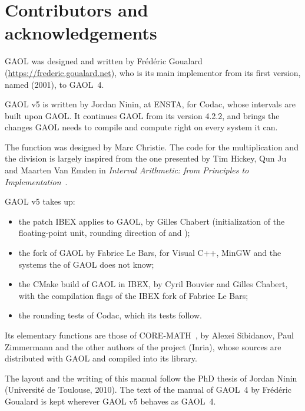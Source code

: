 \documentclass[12pt,a4paper,twoside,openright]{book}
\begin{document}
\chapter*{Contributors and acknowledgements}
\thispagestyle{plain}

GAOL was designed and written by Fr\'ed\'eric Goualard
(\url{https://frederic.goualard.net}), who is its main implementor from its
first version, named  (2001), to GAOL~4.

GAOL v5 is written by Jordan Ninin, at ENSTA, for Codac, whose intervals are
built upon GAOL. It continues GAOL from its version 4.2.2, and brings the
changes GAOL needs to compile and compute right on every system it can.

\medskip
The function  was
designed by Marc Christie. The code for the multiplication and the division
is largely inspired from the one presented by Tim Hickey, Qun Ju and Maarten
Van Emden in \emph{Interval Arithmetic: from Principles to
Implementation}~\cite{Hickey-Ju-vanEmden:2001}.

\medskip
GAOL v5 takes up:
\begin{itemize}
\item[$\bullet$] the patch IBEX applies to GAOL, by Gilles Chabert
  (initialization of the floating-point unit, rounding direction of
   and );
\item[$\bullet$] the fork of GAOL by Fabrice Le Bars, for Visual C++, MinGW
  and the systems the  of GAOL does not know;
\item[$\bullet$] the CMake build of GAOL in IBEX, by Cyril Bouvier and Gilles
  Chabert, with the compilation flags of the IBEX fork of Fabrice Le Bars;
\item[$\bullet$] the rounding tests of Codac, which its tests follow.
\end{itemize}

\medskip
\noindent
Its elementary functions are those of CORE-MATH~\cite{CoreMath:2022}, by
Alexei Sibidanov, Paul Zimmermann and the other authors of the project
(Inria), whose sources are distributed with GAOL and compiled into its
library.

\medskip
\noindent
The layout and the writing of this manual follow the PhD thesis of Jordan
Ninin (Universit\'e de Toulouse, 2010). The text of the manual of GAOL~4 by
Fr\'ed\'eric Goualard is kept wherever GAOL v5 behaves as GAOL~4.

\end{document}
